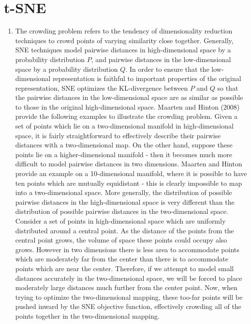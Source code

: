 \documentclass[a4paper]{article}
\begin{document}
\section{t-SNE}
\begin{enumerate}
\item{
The crowding problem refers to the tendency of dimensionality reduction techniques to crowd points of varying similarity close together.  Generally, SNE techniques model pairwise distances in high-dimensional space by a probability distribution $P$, and pairwise distances in the low-dimensional space by a probability distribution $Q$. In order to ensure that the low-dimensional representation is faithful to important properties of the original representation, SNE optimizes the KL-divergence between $P$ and $Q$ so that the pairwise distances in the low-dimensional space are as similar as possible to those in the original high-dimensional space. 
\newline
\newline
Maarten and Hinton (2008) provide the following examples to illustrate the crowding problem. Given a set of points which lie on a two-dimensional manifold in high-dimensional space, it is fairly straightforward to effectively describe their pairwise distances with a two-dimensional map. On the other hand, suppose these points lie on a higher-dimensional manifold - then it becomes much more difficult to model pairwise distances in two dimensions. Maarten and Hinton provide an example on a 10-dimensional manifold, where it is possible to have ten points which are mutually equidistant - this is clearly impossible to map into a two-dimensional space. 
\newline
\newline
More generally, the distribution of possible pairwise distances in the high-dimensional space is very different than the distribution of possible pairwise distances in the two-dimensional space. Consider a set of points in high-dimensional space which are uniformly distributed around a central point. As the distance of the points from the central point grows, the volume of space these points could occupy also grows. However in two dimensions there is less area to accommodate points which are moderately far from the center than there is to accommodate points which are near the center. Therefore, if we attempt to model small distances accurately in the two-dimensional space, we will be forced to place moderately large distances much further from the center point. Now, when trying to optimize the two-dimensional mapping, these too-far points will be pushed inward by the SNE objective function, effectively crowding all of the points together in the two-dimensional mapping.
}
\end{enumerate}
\end{document}
